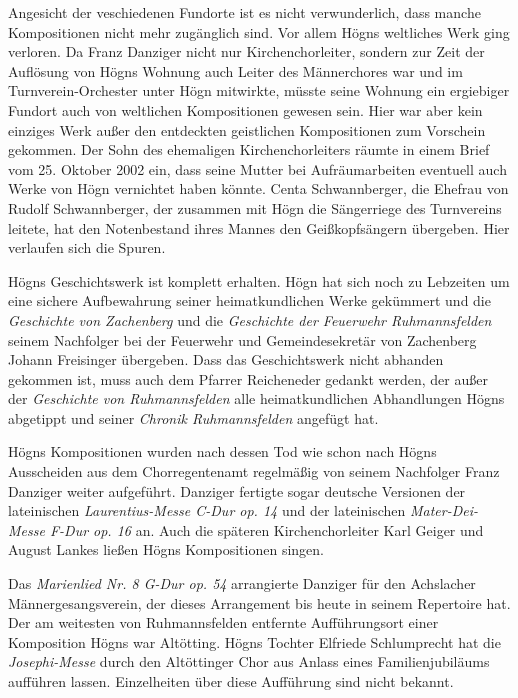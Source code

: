 \documentclass{book}
\begin{document}
Angesicht der veschiedenen Fundorte ist es nicht verwunderlich, dass
manche Kompositionen nicht mehr zugänglich sind. Vor allem Högns
weltliches Werk ging verloren. Da Franz Danziger nicht nur
Kirchenchorleiter, sondern zur Zeit der Auflösung von Högns Wohnung
auch Leiter des Männerchores war und im Turnverein-Orchester unter Högn
mitwirkte, müsste seine Wohnung ein ergiebiger Fundort auch von
weltlichen Kompositionen gewesen sein. Hier war aber kein einziges Werk
außer den entdeckten geist\-lichen Kompositionen zum Vorschein
gekommen. Der Sohn des ehemaligen Kirchenchorleiters räumte in einem
Brief vom 25. Oktober 2002 ein, dass seine Mutter bei Aufräumarbeiten
eventuell auch Werke von Högn vernichtet haben könnte. Centa
Schwannberger, die Ehefrau von Rudolf Schwannberger, der zusammen mit
Högn die Sängerriege des Turnvereins leitete, hat den No\-tenbestand
ihres Mannes den Geißkopfsängern übergeben. Hier verlaufen sich die
Spuren.

Högns Geschichtswerk ist komplett erhalten. Högn hat sich noch zu
Leb\-zeiten um eine sichere Aufbewahrung seiner heimatkundlichen Werke
ge\-kümmert und die \textit{Geschichte von Zachenberg} und die
\textit{Geschichte der Feuerwehr Ruh\-mannsfelden} seinem Nachfolger
bei der Feuerwehr und Gemeindesekretär von Zachenberg Johann Freisinger
übergeben. Dass das Geschichtswerk nicht ab\-handen gekommen ist, muss
auch dem Pfarrer Reicheneder gedankt werden, der außer der
\textit{Geschichte von Ruhmannsfelden} alle heimatkundlichen
Abhandlun\-gen Högns abgetippt und seiner \textit{Chronik
Ruhmannsfelden} angefügt hat.

Högns Kompositionen wurden nach dessen Tod wie schon nach Högns
Ausscheiden aus dem Chorregentenamt regelmäßig von seinem Nachfolger
Franz Danziger weiter aufgeführt. Danziger fertigte sogar deutsche
Versionen der lateinischen \textit{Laurentius-Messe C-Dur op. 14} und
der lateinischen \textit{Mater-Dei-Messe F-Dur op. 16} an. Auch die
späteren Kirchenchorleiter Karl Geiger und August Lankes ließen Högns
Kompositionen singen.

Das \textit{Marienlied Nr. 8 G-Dur op. 54} arrangierte Danziger für den
Achslacher Männergesangsverein, der dieses Arrangement bis heute in
seinem Repertoire hat. Der am weitesten von Ruhmannsfelden entfernte
Aufführungsort einer Komposition Högns war Altötting. Högns Tochter
Elfriede Schlumprecht hat die \textit{Josephi-Messe} durch den
Altöttinger Chor aus Anlass eines Familienjubilä\-ums aufführen lassen.
Einzelheiten über diese Aufführung sind nicht bekannt.
\end{document}
